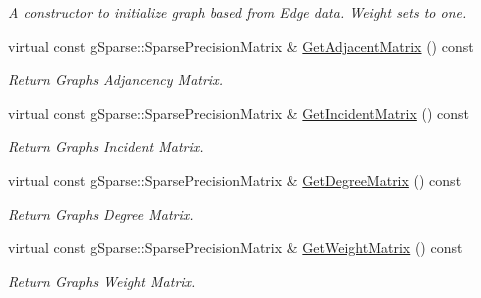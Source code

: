 \begin{DoxyCompactItemize}
\begin{DoxyCompactList}\small\item\em A constructor to initialize graph based from Edge data. Weight sets to one. \end{DoxyCompactList}\item 
\mbox{\label{classg_sparse_1_1_undirected_graph_a7da2614a0e2d08d0db333b33805653a5}} 
virtual const g\+Sparse\+::\+Sparse\+Precision\+Matrix \& \mbox{\hyperlink{classg_sparse_1_1_undirected_graph_a7da2614a0e2d08d0db333b33805653a5}{Get\+Adjacent\+Matrix}} () const
\begin{DoxyCompactList}\small\item\em Return Graph\textquotesingle{}s Adjancency Matrix. \end{DoxyCompactList}\item 
\mbox{\label{classg_sparse_1_1_undirected_graph_a27df92e35ec3268554cf90b8d338e239}} 
virtual const g\+Sparse\+::\+Sparse\+Precision\+Matrix \& \mbox{\hyperlink{classg_sparse_1_1_undirected_graph_a27df92e35ec3268554cf90b8d338e239}{Get\+Incident\+Matrix}} () const
\begin{DoxyCompactList}\small\item\em Return Graph\textquotesingle{}s Incident Matrix. \end{DoxyCompactList}\item 
\mbox{\label{classg_sparse_1_1_undirected_graph_a5d4e1c4a7954d963042e07f59148bda8}} 
virtual const g\+Sparse\+::\+Sparse\+Precision\+Matrix \& \mbox{\hyperlink{classg_sparse_1_1_undirected_graph_a5d4e1c4a7954d963042e07f59148bda8}{Get\+Degree\+Matrix}} () const
\begin{DoxyCompactList}\small\item\em Return Graph\textquotesingle{}s Degree Matrix. \end{DoxyCompactList}\item 
\mbox{\label{classg_sparse_1_1_undirected_graph_a0cc819ed304d93041444ae34dd70c4ca}} 
virtual const g\+Sparse\+::\+Sparse\+Precision\+Matrix \& \mbox{\hyperlink{classg_sparse_1_1_undirected_graph_a0cc819ed304d93041444ae34dd70c4ca}{Get\+Weight\+Matrix}} () const
\begin{DoxyCompactList}\small\item\em Return Graph\textquotesingle{}s Weight Matrix. \end{DoxyCompactList}\item 

\end{DoxyCompactItemize}

